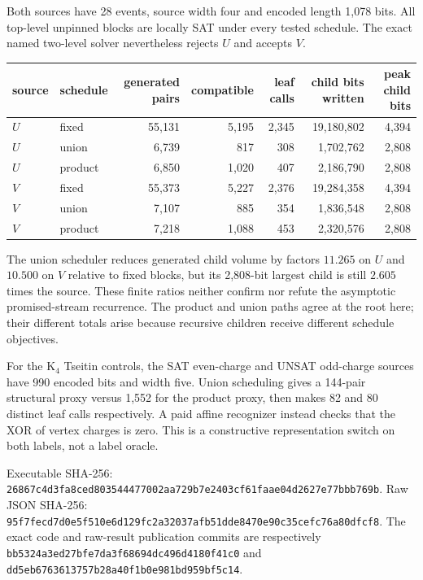 \documentclass[11pt]{article}
\begin{document}
Both sources have 28 events, source width four and encoded length 1,078 bits.
All top-level unpinned blocks are locally SAT under every tested schedule.
The exact named two-level solver nevertheless rejects $U$ and accepts $V$.
\begin{center}\small
\begin{tabular}{llrrrrr}
\toprule
source & schedule & generated pairs & compatible & leaf calls & child bits written & peak child bits\\
\midrule
$U$ & fixed   & 55,131 & 5,195 & 2,345 & 19,180,802 & 4,394\\
$U$ & union   &  6,739 &   817 &   308 &  1,702,762 & 2,808\\
$U$ & product &  6,850 & 1,020 &   407 &  2,186,790 & 2,808\\
$V$ & fixed   & 55,373 & 5,227 & 2,376 & 19,284,358 & 4,394\\
$V$ & union   &  7,107 &   885 &   354 &  1,836,548 & 2,808\\
$V$ & product &  7,218 & 1,088 &   453 &  2,320,576 & 2,808\\
\bottomrule
\end{tabular}
\end{center}
The union scheduler reduces generated child volume by factors $11.265$ on
$U$ and $10.500$ on $V$ relative to fixed blocks, but its 2,808-bit largest
child is still $2.605$ times the source.  These finite ratios neither confirm
nor refute the asymptotic promised-stream recurrence.  The product and union
paths agree at the root here; their different totals arise because recursive
children receive different schedule objectives.

For the K$_4$ Tseitin controls, the SAT even-charge and UNSAT odd-charge
sources have 990 encoded bits and width five.  Union scheduling gives a
144-pair structural proxy versus 1,552 for the product proxy, then makes 82
and 80 distinct leaf calls respectively.  A paid affine recognizer instead
checks that the XOR of vertex charges is zero.  This is a constructive
representation switch on both labels, not a label oracle.

Executable SHA-256:
\texttt{26867c4d3fa8ced803544477002aa729b7e2403cf61faae04d2627e77bbb769b}.
Raw JSON SHA-256:
\texttt{95f7fecd7d0e5f510e6d129fc2a32037afb51dde8470e90c35cefc76a80dfcf8}.
The exact code and raw-result publication commits are respectively
\texttt{bb5324a3ed27bfe7da3f68694dc496d4180f41c0} and
\texttt{dd5eb6763613757b28a40f1b0e981bd959bf5c14}.
\end{document}
